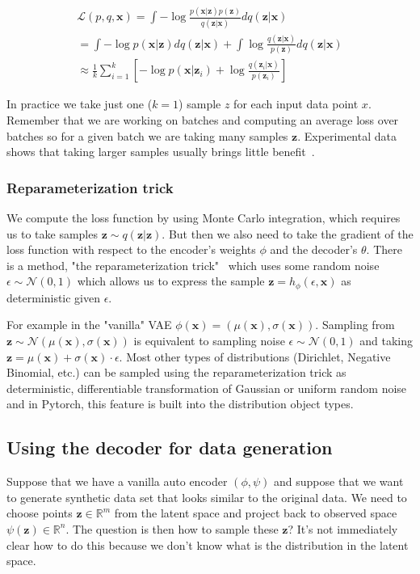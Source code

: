\documentclass[11pt, a4paper]{report}
\theoremstyle{plain}
\theoremstyle{definition}
\theoremstyle{remark}
\newcommand{\R}{\mathbb{R}}
\newcommand{\x}{\mathbf{x}}
\newcommand{\z}{\mathbf{z}}
\newcommand{\LL}{\mathcal{L}}
\newcommand{\NN}{\mathcal{N}}
\begin{document}
\begin{equation}
\begin{aligned}
\LL(p,q,\x) = 
\int - \log \frac{p(\x|\z)p(\z)}{q(\z|\x)}dq(\z|\x) \\
= \int -\log p(\x|\z)dq(\z|\x) + 
\int \log \frac{q(\z|\x)}{p(\z)}dq(\z|\x) \\
\approx \frac{1}{k} \sum_{i=1}^k [-\log p(\x|\z_i)
+ \log \frac{q(\z_i|\x)}{p(\z_i)} ]
\label{eq:elbomc}
\end{aligned}
\end{equation}

In practice we take just one ($k=1$) sample $z$ for each input data point $x$.
Remember that we are working on batches and computing an average loss over
batches so for a given batch we are taking many samples $\z$.
Experimental data shows that taking larger samples usually brings little
benefit~\cite{kingma2019introduction}.

\subsubsection{Reparameterization trick}

We compute the loss function by using Monte Carlo integration, which requires us
to take samples $\z \sim q(\z | \z)$. But then we also need to take the gradient
of the loss function with respect to the encoder's weights $\phi$ and the
decoder's $\theta$. There is a method, "the reparameterization
trick"~\cite{kingma2013auto} which uses
some random noise $\epsilon \sim \NN(0,1)$ which allows us to express the
sample $\z = h_{\phi}(\epsilon, \x)$ as deterministic given $\epsilon$.

For example in the "vanilla" VAE $\phi(\x) = (\mu(\x), \sigma(\x))$. Sampling
from $\z \sim \NN(\mu(\x), \sigma(\x))$ is equivalent to sampling noise
$\epsilon \sim \NN(0,1)$ and taking $\z = \mu(\x) + \sigma(\x) \cdot \epsilon$.
Most other types of distributions (Dirichlet, Negative Binomial, etc.) can be
sampled using the reparameterization trick as deterministic, differentiable
transformation of Gaussian or uniform random noise and in Pytorch, this feature
is built into the distribution object types.


\subsection{Using the decoder for data generation}

Suppose that we have a vanilla auto encoder $(\phi, \psi)$ and suppose that we
want to generate synthetic data set that looks similar to the original data.
We need to choose points $\z \in \R^m$ from the latent space and project back to
observed space $\psi(\z) \in \R^n$. The question is then how to sample these $\z$?
It's not immediately clear how to do this because we don't know what is the
distribution in the latent space.
\end{document}
